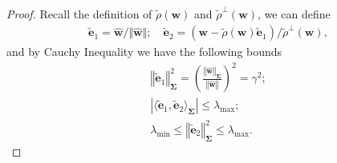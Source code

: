 \documentclass[pdflatex,sn-basic]{sn-jnl}%
\theoremstyle{thmstyleone}%
\begin{document}
\begin{appendices}
\begin{proof}
  Recall the definition of $\tilde{{\rho}}(\mathbf{w})$ and $\tilde{{\rho}}^{\perp}(\mathbf{w})$, we can define 
  \begin{equation*}
  \begin{aligned}
    \tilde{\mathbf{e}}_1 = \hat{\mathbf{w}} / \Vert \hat{\mathbf{w}} \Vert;
    \quad
    \tilde{\mathbf{e}}_2 = \left( \mathbf{w} - \tilde{{\rho}}(\mathbf{w}) \tilde{\mathbf{e}}_1 \right) / \tilde{\rho}^{\perp} \left(\mathbf{w}\right),
  \end{aligned}
  \end{equation*}
  and by Cauchy Inequality we have the following bounds
  \begin{equation}\label{eq:span_sigma_eigen_bounds}
  \begin{aligned}
    \left\Vert \tilde{\mathbf{e}}_1 \right\Vert_{\mathbf{\Sigma}}^2 = 
    \left(
      \frac{
        \left\Vert \hat{\mathbf{w}} \right\Vert_{\mathbf{\Sigma}}
      }{
        \left\Vert \hat{\mathbf{w}} \right\Vert
      }
    \right)^2 = \gamma^2;
    \\ 
    | \langle \tilde{\mathbf{e}}_1, \tilde{\mathbf{e}}_2 \rangle_{\mathbf{\Sigma}} | \le \lambda_{\max};
    \\ 
    \lambda_{\min} \le \left\Vert  \tilde{\mathbf{e}}_2 \right\Vert_{\mathbf{\Sigma}}^2 \le \lambda_{\max}.
  \end{aligned}
  \end{equation}


\end{proof}
\end{appendices}
\end{document}
